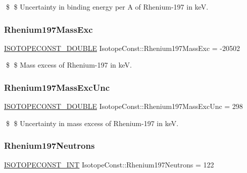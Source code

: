 \$ \$ Uncertainty in binding energy per A of Rhenium-\/197 in keV. \mbox{\label{group___isotope_const-_rhenium-_re197_ga066f49d9f3cb5270896c6a1faae67544}} 
\subsubsection{\texorpdfstring{Rhenium197\+Mass\+Exc}{Rhenium197MassExc}}
{\footnotesize\ttfamily \mbox{\hyperlink{group___isotope_const-_macros_ga8f45a7272ce02c0b4c65c44636ed719a}{I\+S\+O\+T\+O\+P\+E\+C\+O\+N\+S\+T\+\_\+\+D\+O\+U\+B\+LE}} Isotope\+Const\+::\+Rhenium197\+Mass\+Exc = -\/20502}

\$ \$ Mass excess of Rhenium-\/197 in keV. \mbox{\label{group___isotope_const-_rhenium-_re197_ga3f74038eaf905632411485aa45b458f8}} 
\subsubsection{\texorpdfstring{Rhenium197\+Mass\+Exc\+Unc}{Rhenium197MassExcUnc}}
{\footnotesize\ttfamily \mbox{\hyperlink{group___isotope_const-_macros_ga8f45a7272ce02c0b4c65c44636ed719a}{I\+S\+O\+T\+O\+P\+E\+C\+O\+N\+S\+T\+\_\+\+D\+O\+U\+B\+LE}} Isotope\+Const\+::\+Rhenium197\+Mass\+Exc\+Unc = 298}

\$ \$ Uncertainty in mass excess of Rhenium-\/197 in keV. \mbox{\label{group___isotope_const-_rhenium-_re197_ga77daceff6bf03bcc8db03a9766b8db31}} 
\subsubsection{\texorpdfstring{Rhenium197\+Neutrons}{Rhenium197Neutrons}}
{\footnotesize\ttfamily \mbox{\hyperlink{group___isotope_const-_macros_ga5f18360b3e99483a35c32d789e62621c}{I\+S\+O\+T\+O\+P\+E\+C\+O\+N\+S\+T\+\_\+\+I\+NT}} Isotope\+Const\+::\+Rhenium197\+Neutrons = 122}

